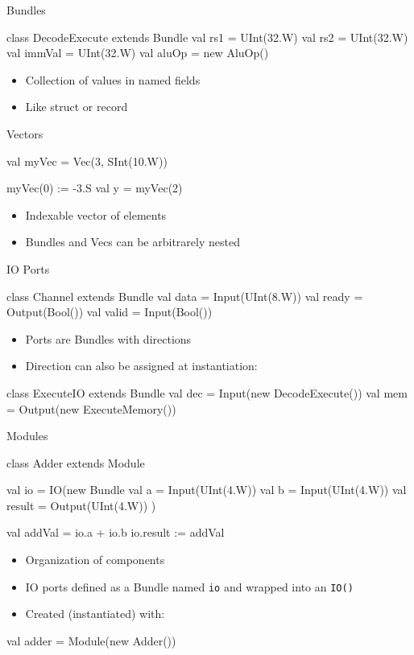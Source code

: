 \documentclass[xcolor=pdflatex,dvipsnames,table]{beamer}
\newcommand{\code}[1]{{\texttt{#1}}}
\begin{document}
\begin{frame}[fragile]{Bundles}
\begin{chisel}
class DecodeExecute extends Bundle {
  val rs1 = UInt(32.W)
  val rs2 = UInt(32.W)
  val immVal = UInt(32.W)
  val aluOp = new AluOp()
}
\end{chisel}
\begin{itemize}
\item Collection of values in named fields 
\item Like struct or record
\end{itemize}
\end{frame}

\begin{frame}[fragile]{Vectors}
\begin{chisel}
val myVec = Vec(3, SInt(10.W))

myVec(0) := -3.S
val y = myVec(2)
\end{chisel}
\begin{itemize}
\item Indexable vector of elements
\item Bundles and Vecs can be arbitrarely nested
\end{itemize}
\end{frame}

\begin{frame}[fragile]{IO Ports}
\begin{chisel}
class Channel extends Bundle {
  val data = Input(UInt(8.W))
  val ready = Output(Bool())
  val valid = Input(Bool())
}
\end{chisel}
\begin{itemize}
\item Ports are Bundles with directions
\item Direction can also be assigned at instantiation:
\end{itemize}
\begin{chisel}
class ExecuteIO extends Bundle {
  val dec = Input(new DecodeExecute())
  val mem = Output(new ExecuteMemory())
}
\end{chisel}
\end{frame}

\begin{frame}[fragile]{Modules}
\begin{chisel}
class Adder extends Module {
  val io = IO(new Bundle {
    val a = Input(UInt(4.W))
    val b = Input(UInt(4.W))
    val result = Output(UInt(4.W))
  })

  val addVal = io.a + io.b
  io.result := addVal
}
\end{chisel}
\begin{itemize}
\item Organization of components
\item IO ports defined as a Bundle named \code{io} and wrapped into an \code{IO()}
\item Created (instantiated) with:
\end{itemize}
\begin{chisel}
val adder = Module(new Adder())
\end{chisel}
\end{frame}
\end{document}
